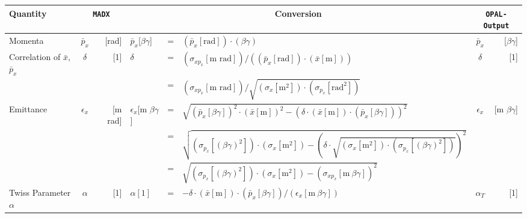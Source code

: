 \begin{sidewaystable}
\begin{tabular}{|l|c r|l c l |c r| }
\hline
Quantity & \multicolumn{2}{|c|}{\texttt{MADX}} & \multicolumn{3}{|c|}{Conversion} & \multicolumn{2}{c|}{\texttt{OPAL-Output}}\\\hline

Momenta &$\bar{p}_{x}$ & [rad] & $\bar{p}_{x}$[$\beta\gamma$] &=& $\left(\bar{p}_{x}\left[\text{rad}\right]\right)\cdot\left(\beta\gamma\right)$ &$\bar{p}_{x}$ &[$\beta\gamma$]\\\hline

Correlation of $\bar{x}$,$\bar{p}_{x}$ & $\delta$ & [1] & $\delta$ & = & $\left(\sigma_{x p_{x}}\left[\text{m }\text{rad}\right]\right)/\left(\left(\bar{p}_{x}\left[\text{rad}\right]\right)\cdot\left(
\bar{x}\left[\text{m}\right]\right)\right)$ & $\delta$ & [1]\\

 & & & & = &$\left(\sigma_{x p_{x}}\left[\text{m }\text{rad}\right]\right)/\sqrt{\left(\sigma_{x}\left[\text{m}^{2}\right]\right)\cdot\left(\sigma_{ p_{x}}\left[\text{rad}^{2}\right]\right)}$ & & \\\hline

Emittance & $\epsilon_{x}$ & [m rad] &$\epsilon_{x}$[m $\beta\gamma$] &= & $\sqrt{\left( \bar{p}_{x}\left[ \beta\gamma \right] \right) ^{2} \cdot \left(\bar{x}\left[\text{m}\right]\right)^{2} - \left(\delta \cdot \left(\bar{x}\left[\text{m}\right]\right) \cdot \left(\bar{p}_{x}\left[\beta\gamma\right]\right)\right)^{2}} $ &$\epsilon_{x}$ &[m $\beta\gamma$] \\

 & & & & = &$\sqrt{\left( \sigma_{{p}_{x}}\left[ \left(\beta\gamma\right)^{2} \right] \right)\cdot
 \left(\sigma_{x}\left[\text{m}^{2}\right]\right) - \left(\delta \cdot
 \sqrt{\left(\sigma_{x}\left[\text{m}^{2}\right]\right)\cdot\left(\sigma_{p_{x}}
 \left[\left(\beta\gamma\right)^{2}\right]\right)}\right)^{2}} $  & & \\

 & & & & = &$\sqrt{\left( \sigma_{{p}_{x}}\left[ \left(\beta\gamma\right)^{2} \right] \right)\cdot
 \left(\sigma_{x}\left[\text{m}^{2}\right]\right) - \left(\sigma_{x p_{x}}\left[\text{m} ~\beta\gamma\right]\right)^{2}} $  & & \\\hline

Twiss Parameter $\alpha$ & $\alpha$ & [1] & $\alpha\left[1\right]$ & = & $-\delta\cdot\left(\bar{x}\left[\text{m}\right]\right)\cdot\left(\bar{p}_{x}\left[\beta\gamma\right]\right)/\left(\epsilon_{x}\left[\text{m}~\beta\gamma\right]\right)$ &$\alpha_{T}$ & [1]  \\


\end{tabular}
\end{sidewaystable}

